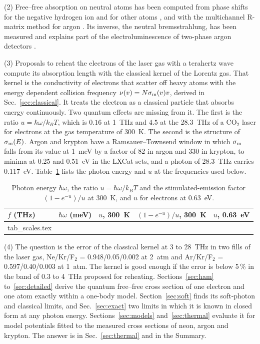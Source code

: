 \documentclass[11pt]{article}
\makeatletter
\numberwithin{equation}{section}
\newcommand{\tabinput}[1]{\@@input #1 }
\newcommand{\kB}{k_B}
\newcommand{\sm}{\sigma_{\rm m}}
\makeatother
\begin{document}
{\noindent}(2) Free--free absorption on neutral atoms has been computed from
phase shifts for the negative hydrogen ion \cite{OhmuraOhmura1960} and for
other atoms \cite{Geltman1973}, and with the multichannel R-matrix method for
argon \cite{BellBerrington1987}. Its inverse, the neutral bremsstrahlung, has
been measured \cite{TaylorCaledonia1969,Ranson1977} and explains part of the
electroluminescence of two-phase argon detectors \cite{Buzulutskov2018}.

{\noindent}(3) Proposals to reheat the electrons of the laser gas with a
terahertz wave compute its absorption length with the classical kernel of the
Lorentz gas. That kernel is the
conductivity of electrons that scatter off heavy atoms with the energy
dependent collision frequency $\nu(v)=N\sm(v)v$, derived in
Sec.~\ref{sec:classical}. It treats the electron as a classical particle that
absorbs energy continuously. Two quantum effects are missing from it. The
first is the ratio $u=\hbar\omega/\kB T$, which is $0.16$ at 1~THz and $4.5$
at the 28.3~THz of a CO$_2$ laser for electrons at the gas temperature of
300~K. The second is the structure of $\sm(E)$. Argon and krypton have a
Ramsauer--Townsend window in which $\sm$ falls from its value at 1~meV by a
factor of 82 in argon and 330 in krypton, to minima at 0.25 and 0.51~eV in the
LXCat sets, and a photon of 28.3~THz carries 0.117~eV. Table~\ref{tab:scales}
lists the photon energy and $u$ at the frequencies used below.

\begin{table}[ht]
\caption{Photon energy $\hbar\omega$, the ratio $u=\hbar\omega/\kB T$ and the
stimulated-emission factor $(1-e^{-u})/u$ at 300~K, and $u$ for electrons at
0.63~eV.}
\label{tab:scales}
\begin{center}
\begin{tabular}{lcccc}
\toprule
$f$ (THz) & $\hbar\omega$ (meV) & $u$, 300~K & $(1-e^{-u})/u$, 300~K & $u$, 0.63~eV\\
\midrule
\tabinput{tab_scales.tex}
\bottomrule
\end{tabular}
\end{center}
\end{table}

{\noindent}(4) The question is the error of the classical kernel at 3 to
28~THz in two fills of the laser gas, Ne/Kr/F$_2$ = 0.948/0.05/0.002 at
2~atm and Ar/Kr/F$_2$ = 0.597/0.40/0.003 at 1~atm. The kernel is good enough
if the error is below 5\,\% in the band of 0.3 to 4~THz proposed for reheating.
Sections~\ref{sec:ham} to~\ref{sec:detailed} derive the quantum free--free
cross section of one electron and one atom exactly within a one-body model.
Section~\ref{sec:soft} finds its soft-photon and classical limits, and
Sec.~\ref{sec:exact} two limits in which it is known in closed form at any
photon energy. Sections~\ref{sec:models} and~\ref{sec:thermal} evaluate it for
model potentials fitted to the measured cross sections of neon, argon and
krypton. The answer is in Sec.~\ref{sec:thermal} and in the Summary.
\end{document}
